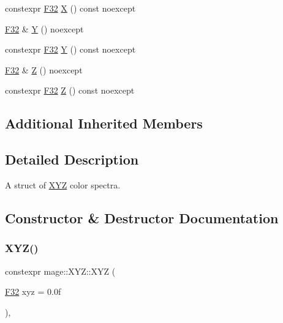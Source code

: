 \begin{DoxyCompactItemize}
constexpr \mbox{\hyperlink{namespacemage_aa97e833b45f06d60a0a9c4fc22ae02c0}{F32}} \mbox{\hyperlink{structmage_1_1_x_y_z_ab6e2fb7de212056b6f36a33d5672bc57}{X}} () const noexcept
\item 
\mbox{\hyperlink{namespacemage_aa97e833b45f06d60a0a9c4fc22ae02c0}{F32}} \& \mbox{\hyperlink{structmage_1_1_x_y_z_a277aef6e7324279be52ece341116eb3c}{Y}} () noexcept
\item 
constexpr \mbox{\hyperlink{namespacemage_aa97e833b45f06d60a0a9c4fc22ae02c0}{F32}} \mbox{\hyperlink{structmage_1_1_x_y_z_a9e182a271d824fc68487bb6c49b9235a}{Y}} () const noexcept
\item 
\mbox{\hyperlink{namespacemage_aa97e833b45f06d60a0a9c4fc22ae02c0}{F32}} \& \mbox{\hyperlink{structmage_1_1_x_y_z_a3373a4b3b08a49027310f488a03df5df}{Z}} () noexcept
\item 
constexpr \mbox{\hyperlink{namespacemage_aa97e833b45f06d60a0a9c4fc22ae02c0}{F32}} \mbox{\hyperlink{structmage_1_1_x_y_z_ad7a039b462416d0548a53aa7025af70b}{Z}} () const noexcept
\end{DoxyCompactItemize}
\subsection*{Additional Inherited Members}


\subsection{Detailed Description}
A struct of \mbox{\hyperlink{structmage_1_1_x_y_z}{X\+YZ}} color spectra. 

\subsection{Constructor \& Destructor Documentation}
\mbox{\label{structmage_1_1_x_y_z_af8b9ef53daa7463097c6397644a24ebf}} 
\subsubsection{\texorpdfstring{X\+Y\+Z()}{XYZ()}\hspace{0.1cm}{\footnotesize\ttfamily [1/6]}}
{\footnotesize\ttfamily constexpr mage\+::\+X\+Y\+Z\+::\+X\+YZ (\begin{DoxyParamCaption}\item[{\mbox{\hyperlink{namespacemage_aa97e833b45f06d60a0a9c4fc22ae02c0}{F32}}}]{xyz = {\ttfamily 0.0f} }\end{DoxyParamCaption})\hspace{0.3cm}{\ttfamily [explicit]}, {\ttfamily [noexcept]}}

